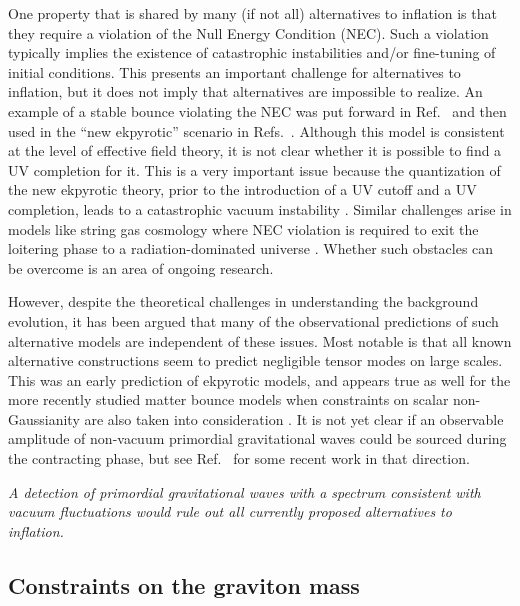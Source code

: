 One property that is shared by many (if not all) alternatives to inflation is that they require a violation of the Null Energy Condition (NEC). 
Such a violation typically implies the existence of catastrophic instabilities and/or fine-tuning of initial conditions.
This presents an important challenge for alternatives to inflation, but it does not imply that alternatives are impossible to realize. 
An example of a stable bounce violating the NEC was put forward in Ref.~\cite{Creminelli:2006xe} and then used in the ``new ekpyrotic'' scenario in Refs.~\cite{Buchbinder:2007ad,Creminelli:2007aq}. Although this model is consistent at the level of effective field theory, it is not clear whether it is possible to find a UV completion for it. 
This is a very important issue because the quantization of the new ekpyrotic theory, prior to the introduction of a UV cutoff and a UV completion, leads to a catastrophic vacuum instability \cite{Kallosh:2007ad}.  Similar challenges arise in models like string gas cosmology where NEC violation is required to exit the loitering phase to a radiation-dominated universe
\cite{Brustein:1994kw,Kaloper:1995ey,Kaloper:1995tu,Kaloper:2007pw}.  Whether such obstacles can be overcome is an area of ongoing research.

However, despite the theoretical challenges in understanding the background evolution, it has been argued that many 
of the observational predictions of such alternative models are independent of these issues.
Most notable is that all known alternative constructions seem to predict negligible tensor modes on large scales.
This was an early prediction of ekpyrotic models, and appears true as well for the more recently 
studied matter bounce models when constraints on scalar non-Gaussianity are also taken into consideration \cite{Quintin:2015rta}. It is not yet clear if an observable amplitude of non-vacuum primordial gravitational waves could be sourced during the contracting phase, but see Ref.~\cite{Ben-Dayan:2016iks} for some recent work in that direction.

{\it A detection of primordial gravitational waves with a spectrum consistent with vacuum fluctuations would rule out all currently proposed alternatives to inflation.}

\subsection{Constraints on the graviton mass}

